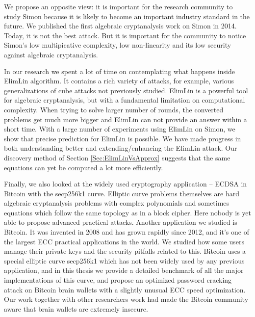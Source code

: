 We propose an opposite view: it is important for the research community to study Simon because it is likely to become an important industry standard in the future. We published the first algebraic cryptanalysis work on Simon in 2014. Today, it is not the best attack. But it is important for the community to notice Simon's low multipicative complexity, low non-linearity and its low security against algebraic cryptanalysis. 

In our research we spent a lot of time on contemplating what happens inside ElimLin algorithm. It contains a rich variety of attacks, for example, various generalizations of cube attacks not previously studied. 
ElimLin is a powerful tool for algebraic cryptanalysis, but with a fundamental limitation on computational complexity. When trying to solve larger number of rounds, the converted problems get much more bigger and ElimLin can not provide an answer within a short time. With a large number of experiments using ElimLin on Simon, we show that precise prediction for ElimLin is possible. We have made progress in both understanding better and extending/enhancing the ElimLin attack. Our discovery method 
of Section \ref{Sec:ElimLinVsApprox} suggests that the same equations can yet be computed a lot more efficiently. 

Finally, we also looked at the widely used cryptography application --  ECDSA in Bitcoin with the secp256k1 curve. Elliptic curve problems themselves are hard algebraic cryptanalysis problems with complex polynomials and sometimes equations which follow the same topology as in a block cipher. Here nobody is yet able to 
propose advanced practical attacks. Another application we studied is Bitcoin. 
It was invented in 2008 and has grown rapidly since 2012, and it's one of the largest ECC practical applications in the world. We studied how some users manage their private keys and the security pitfalls related to this. Bitcoin uses a special elliptic curve secp256k1 which has not been widely used by any previous application, and in this thesis we provide a detailed benchmark of all the major implementations of this curve, and propose an optimized password cracking attack on Bitcoin brain wallets with a slightly unusual ECC  speed optimization. Our work together with other researchers work had made the Bitcoin community aware that brain wallets are extremely insecure.  

